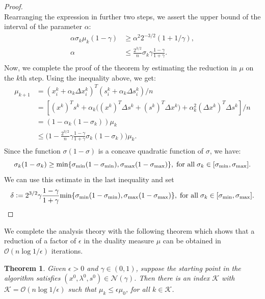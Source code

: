 \documentclass[a4paper,10 pt,titlepage,twoside]{book}
\theoremstyle{plain}
\newtheorem{thm}{Theorem}[chapter]
\theoremstyle{definition}
\theoremstyle{remark}
\begin{document}
\begin{proof}
\begin{equation*}
	\end{equation*}
	Rearranging the expression in further two steps, we assert the upper bound of the interval of the parameter $\alpha$:
	\begin{align*}
	\alpha\sigma_{k}\mu_{k}(1-\gamma)&\geq\alpha^{2}2^{-3/2}(1+1/\gamma),\\
	\alpha&\leq \frac{2^{3/2}}{n} \sigma_{k}\gamma\frac{1-\gamma}{1+\gamma}.\\		
	\end{align*}
	Now, we complete the proof of the theorem by estimating the reduction in $\mu$ on the $k$th step. Using the inequality above, we get:
	\begin{align*}
	\mu_{k+1}& = (x_{i}^{k} + \alpha_{k}\Delta x_{i}^{k})^{T}(s_{i}^{k} + \alpha_{k}\Delta s_{i}^{k})/n\\
	& = [(x^{k})^{T}s^{k} + \alpha_{k}\big((x^{k})^{T}\Delta s^{k} + (s^{k})^{T}\Delta x^{k}\big) +\alpha^{2}_{k}(\Delta x^{k})^{T}\Delta s^{k}]/n\\
	& = (1 - \alpha_{k}(1-\sigma_{k}))\mu_{k}\\
	& \leq \Big(1 - \frac{2^{3/2}}{n}\gamma\frac{1-\gamma}{1+\gamma}\sigma_{k}(1-\sigma_{k})\Big)\mu_{k}.\\
	\end{align*}
	Since the function $\sigma(1 - \sigma)$ is a concave quadratic function of $\sigma$, we have:
	\begin{equation*}
	\sigma_{k}(1-\sigma_{k})\geq \text{min}\{\sigma_{\text{min}}(1-\sigma_{\text{min}}),\sigma_{\text{max}}(1-\sigma_{\text{max}})\}, \text{\;for all\;}\sigma_{k}\in[\sigma_{\text{min}},\sigma_{\text{max}}].
	\end{equation*}
	We can use this estimate in the last inequality and set
	\begin{equation*}
	\delta \vcentcolon=2^{3/2}\gamma\frac{1-\gamma}{1+\gamma}\text{\text{min}}\{\sigma_{\text{min}}(1-\sigma_{\text{min}}),\sigma_{\text{max}}(1-\sigma_{\text{max}})\}, \text{\;for all\;}\sigma_{k}\in[\sigma_{\text{min}},\sigma_{\text{max}}].
	\end{equation*}
\end{proof}
We complete the analysis theory with the following theorem which shows that a reduction of a factor of $\epsilon$ in the duality measure $\mu$ can be obtained in $\mathcal{O}(n\log{1/\epsilon})$ iterations.
\begin{thm}
	Given $\epsilon>0$ and $\gamma\in(0,1)$, suppose the starting point in the algorithm satisfies $(x^{0},\lambda^{0},s^{0})\in\mathcal{N}(\gamma)$. Then there is an index $\mathcal{K}$ with $\mathcal{K}=\mathcal{O}(n\log1/\epsilon)$ such that $\mu_{k}\leq\epsilon\mu_{0}$, for all $k\in\mathcal{K}$.
\end{thm}
\end{document}
